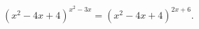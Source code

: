 \begin{ex}[type=equation]
	\begin{condition}
		$(x^2 - 4x  + 4)^{x^2 - 3x} = (x^2 - 4x + 4)^{2x + 6}.$
	\end{condition}
\end{ex}